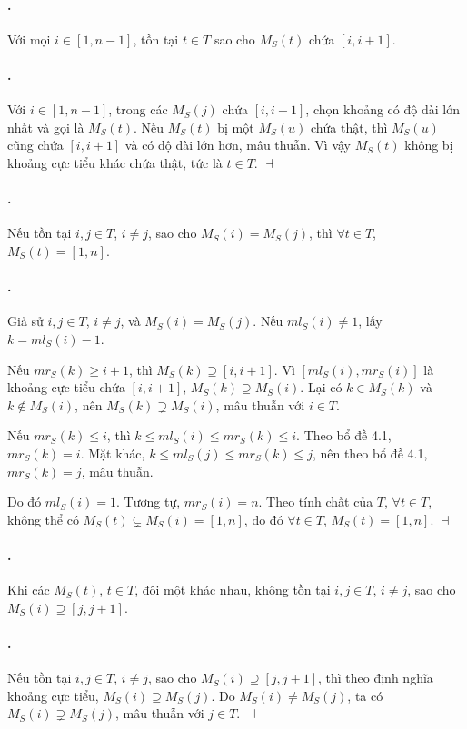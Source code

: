\documentclass[11pt]{article}
\providecommand{\square}{\dashv}
\begin{document}
\paragraph{.}
Với mọi $i\in[1,n-1]$, tồn tại $t\in T$ sao cho $M_S(t)$ chứa $[i,i+1]$.

\paragraph{.}
Với $i\in[1,n-1]$, trong các $M_S(j)$ chứa $[i,i+1]$, chọn khoảng có độ dài
lớn nhất và gọi là $M_S(t)$. Nếu $M_S(t)$ bị một $M_S(u)$ chứa thật, thì
$M_S(u)$ cũng chứa $[i,i+1]$ và có độ dài lớn hơn, mâu thuẫn. Vì vậy $M_S(t)$
không bị khoảng cực tiểu khác chứa thật, tức là $t\in T$. \hfill$\square$

\paragraph{.}
Nếu tồn tại $i,j\in T$, $i\ne j$, sao cho $M_S(i)=M_S(j)$, thì
$\forall t\in T$, $M_S(t)=[1,n]$.

\paragraph{.}
Giả sử $i,j\in T$, $i\ne j$, và $M_S(i)=M_S(j)$. Nếu $ml_S(i)\ne1$, lấy
$k=ml_S(i)-1$.

Nếu $mr_S(k)\ge i+1$, thì $M_S(k)\supseteq[i,i+1]$. Vì $[ml_S(i),mr_S(i)]$ là
khoảng cực tiểu chứa $[i,i+1]$, $M_S(k)\supseteq M_S(i)$. Lại có
$k\in M_S(k)$ và $k\notin M_S(i)$, nên $M_S(k)\supsetneq M_S(i)$, mâu thuẫn
với $i\in T$.

Nếu $mr_S(k)\le i$, thì
$k\le ml_S(i)\le mr_S(k)\le i$. Theo bổ đề 4.1, $mr_S(k)=i$. Mặt khác,
$k\le ml_S(j)\le mr_S(k)\le j$, nên theo bổ đề 4.1, $mr_S(k)=j$, mâu thuẫn.

Do đó $ml_S(i)=1$. Tương tự, $mr_S(i)=n$. Theo tính chất của $T$,
$\forall t\in T$, không thể có $M_S(t)\subsetneq M_S(i)=[1,n]$, do đó
$\forall t\in T$, $M_S(t)=[1,n]$. \hfill$\square$

\paragraph{.}
Khi các $M_S(t)$, $t\in T$, đôi một khác nhau, không tồn tại
$i,j\in T$, $i\ne j$, sao cho $M_S(i)\supseteq[j,j+1]$.

\paragraph{.}
Nếu tồn tại $i,j\in T$, $i\ne j$, sao cho $M_S(i)\supseteq[j,j+1]$, thì theo
định nghĩa khoảng cực tiểu, $M_S(i)\supseteq M_S(j)$. Do
$M_S(i)\ne M_S(j)$, ta có $M_S(i)\supsetneq M_S(j)$, mâu thuẫn với $j\in T$.
\hfill$\square$
\end{document}
